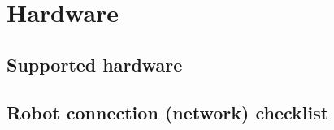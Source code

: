 \chapter{Hardware}
\label{chapter-hardware}




\section{Supported hardware}








\section{Robot connection (network) checklist}

